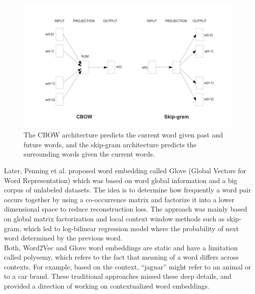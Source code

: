 \documentclass[%
	BCOR=8mm, %
	DIV=12,
	toc=bibliography, %
	toc=listof, %
	oneside, %
	egregdoesnotlikesansseriftitles, %
	]{scrbook}
\begin{document}
\begin{figure}[h!]
    \centering
    \includegraphics[width=0.8\linewidth]{img/cbowandskip.png}
    \caption[Working diagram of CBOW and skip-gram models]{ The CBOW architecture predicts the current word given past and future words, and the skip-gram architecture predicts the surrounding words given the current words.}
    \label{fig:cbow}
\end{figure}
Later, Penning et al. \cite{pennington_glove_2014} proposed word embedding called Glove (Global Vectors for Word Representation) which was based on word global information and a big corpus of unlabeled datasets. The idea is to determine how frequently a word pair occurs together by using a co-occurrence matrix and factorize it into a lower dimensional space to reduce reconstruction loss. The approach was mainly based on global matrix factorization and local context window methods such as skip-gram, which led to log-bilinear regression model where the probability of next word determined by the previous word.\\
 Both, Word2Vec and Glove word embeddings are static and have a limitation called polysemy, which refers to the fact that meaning of a word differs across contexts. For example, based on the context, ``jaguar'' might refer to an animal or to a car brand. These traditional approaches missed these deep details, and provided a direction of working on contextualized word embeddings.
\end{document}
